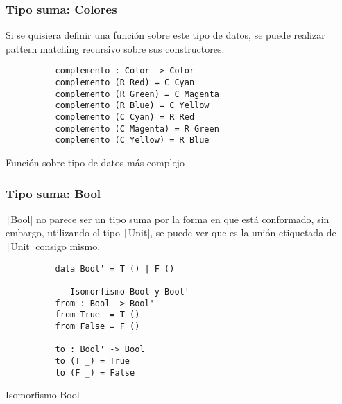 \documentclass{beamer}
\begin{document}
\begin{frame}[fragile]
  \frametitle{Tipo suma: Colores}

  Si se quisiera definir una función sobre este tipo de datos, se puede realizar
  pattern matching recursivo sobre sus constructores:

  \begin{listing}[H]
    \begin{center}
      \begin{minipage}{0.42\textwidth}
          \begin{verbatim}
          complemento : Color -> Color
          complemento (R Red) = C Cyan
          complemento (R Green) = C Magenta
          complemento (R Blue) = C Yellow
          complemento (C Cyan) = R Red
          complemento (C Magenta) = R Green
          complemento (C Yellow) = R Blue
          \end{verbatim}
      \end{minipage}
    \end{center}
    \caption{Función sobre tipo de datos más complejo}
    \label{lst:funcioncolor}
  \end{listing}
\end{frame}

\begin{frame}[fragile]
  \frametitle{Tipo suma: Bool}

  \texttt|Bool| no parece ser un tipo suma por la forma en que está conformado, sin embargo,
  utilizando el tipo \texttt|Unit|, se puede ver que es la unión etiquetada
  de \texttt|Unit| consigo mismo.

  \begin{listing}[H]
    \begin{center}
      \begin{minipage}{0.42\textwidth}
          \begin{verbatim}
          data Bool' = T () | F ()

          -- Isomorfismo Bool y Bool'
          from : Bool -> Bool'
          from True  = T ()
          from False = F ()

          to : Bool' -> Bool
          to (T _) = True
          to (F _) = False
          \end{verbatim}
      \end{minipage}
    \end{center}
    \caption{Isomorfismo Bool}
    \label{lst:isomorfismo}
  \end{listing}
\end{frame}
\end{document}
